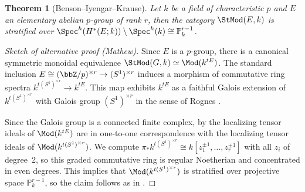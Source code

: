 \documentclass{amsart}%
\numberwithin{equation}{section}%
\newtheorem{Thm}[equation]{Theorem}
\theoremstyle{remark}
\begin{document}
\begin{Thm}[Benson--Iyengar--Krause]\label{thm:elabbikstrat}
Let $k$ be a field of characteristic $p$ and $E$ an elementary abelian $p$-group of rank $r$, then the category $\StMod(E,k)$ is stratified over $\Spec^h(H^*(E;k))\setminus \Spec^h(k) \cong \mathbb{P}_k^{r-1}$.
\end{Thm}
\begin{proof}[Sketch of alternative proof (Mathew)]
Since $E$ is a $p$-group, there is a canonical symmetric monoidal equivalence $\StMod(G,k) \simeq \Mod(k^{tE})$. The standard inclusion $E\cong (\bbZ/p)^{\times r} \to (S^1)^{\times r}$ induces a morphism of commutative ring spectra $k^{t(S^1)^{\times r}} \to k^{tE}$. This map exhibits $k^{tE}$ as a faithful Galois extension of $k^{t(S^1)^{\times r}}$ with Galois group $(S^1)^{\times r}$ in the sense of Rognes \cite{Rognes08}.

Since the Galois group is a connected finite complex, by \cite[Thm.~6.5]{mathew_torus} the localizing tensor ideals of $\Mod(k^{tE})$ are in one-to-one correspondence with the localizing tensor ideals of $\Mod(k^{t(S^1)^{\times r}})$. We compute $\pi_*k^{t(S^1)^{\times r}} \cong k[z_1^{\pm 1},\ldots,z_r^{\pm 1}]$ with all $z_i$ of degree~2, so this graded commutative ring is regular Noetherian and concentrated in even degrees. This implies that  $\Mod(k^{t(S^1)^{\times r}})$ is stratified over projective space $\mathbb{P}_k^{r-1}$, so the claim follows as in \cite[Thm.~6.8]{mathew_torus}.
\end{proof}
\end{document}
